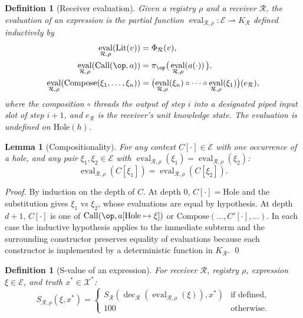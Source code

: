 \documentclass[twocolumn,a4paper]{article}
\newtheorem{lemma}[theorem]{Lemma}
\newtheorem{definition}[theorem]{Definition}
\DeclareMathOperator{\eval}{eval}
\DeclareMathOperator{\dec}{dec}
\newcommand{\Truth}{\mathcal{X}^{*}}
\newcommand{\Expr}{\mathcal{E}}
\newcommand{\receiver}{\mathcal{R}}
\newcommand{\Sscalar}{S}
\begin{document}
\begin{definition}[Receiver evaluation]
\label{def:receiver-eval}
Given a registry $\rho$ and a receiver $\receiver$, the \emph{evaluation} of an expression is the partial function $\eval_{\receiver,\rho}\colon\Expr\rightharpoonup K_{\receiver}$ defined inductively by
\begin{align*}
\eval_{\receiver,\rho}(\mathrm{Lit}(v)) &= \Phi_{\receiver}(v),\\
\eval_{\receiver,\rho}(\mathrm{Call}(\op,a)) &= \pi_{\op}\bigl(\,\eval_{\receiver,\rho}(a(\cdot))\,\bigr),\\
\eval_{\receiver,\rho}(\mathrm{Compose}(\xi_{1},\ldots,\xi_{n})) &= \bigl(\eval_{\receiver,\rho}(\xi_{n})\circ\cdots\circ\eval_{\receiver,\rho}(\xi_{1})\bigr)(e_{\receiver}),
\end{align*}
where the composition $\circ$ threads the output of step $i$ into a designated \emph{piped input} slot of step $i+1$, and $e_{\receiver}$ is the receiver's unit knowledge state. The evaluation is undefined on $\mathrm{Hole}(h)$.
\end{definition}

\begin{lemma}[Compositionality]
\label{lem:compositionality}
For any context $C[\cdot]\in\Expr$ with one occurrence of a hole, and any pair $\xi_{1},\xi_{2}\in\Expr$ with $\eval_{\receiver,\rho}(\xi_{1})=\eval_{\receiver,\rho}(\xi_{2})$:
\[
\eval_{\receiver,\rho}(C[\xi_{1}])=\eval_{\receiver,\rho}(C[\xi_{2}]).
\]
\end{lemma}

\begin{proof}
By induction on the depth of $C$. At depth $0$, $C[\cdot]=\mathrm{Hole}$ and the substitution gives $\xi_{1}$ vs $\xi_{2}$, whose evaluations are equal by hypothesis. At depth $d+1$, $C[\cdot]$ is one of $\mathrm{Call}(\op,a[\mathrm{Hole}\mapsto\xi])$ or $\mathrm{Compose}(\ldots,C'[\cdot],\ldots)$. In each case the inductive hypothesis applies to the immediate subterm and the surrounding constructor preserves equality of evaluations because each constructor is implemented by a deterministic function in $K_{\receiver}$. \qed
\end{proof}

\begin{definition}[S-value of an expression]
\label{def:s-value-expr}
For receiver $\receiver$, registry $\rho$, expression $\xi\in\Expr$, and truth $x^{*}\in\Truth$:
\[
\Sscalar_{\receiver,\rho}(\xi,x^{*}) =
\begin{cases}
\Sscalar_{\receiver}(\dec_{\receiver}(\eval_{\receiver,\rho}(\xi)),x^{*}) & \text{if defined},\\
100 & \text{otherwise}.
\end{cases}
\]
\end{definition}
\end{document}
